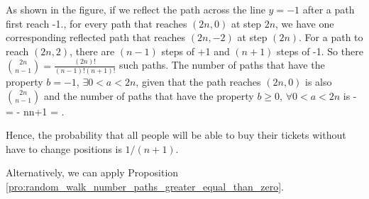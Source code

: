 \begin{solution}[\bf Solution.]
As shown in the figure, if we reflect the path across the line $y=-1$ after a path first reach -1., for every path that reaches $(2n,0)$ at step $2n$, we have one corresponding reflected path that
reaches $(2n,-2)$ at step $(2n)$. For a path to reach $(2n,2)$, there are $(n-1)$ steps of +1 and $(n+1)$ steps of -1. So there $\binom{2n}{n-1} = \frac{(2n)!}{(n-1)!(n+1)!}$ such paths. The number
of paths that have the property $b=-1$, $\exists 0<a<2n$, given that the path reaches $(2n,0)$ is also $\binom{2n}{n-1}$ and the number of paths that have the property $b\geq 0$, $\forall 0<a<2n$ is
\be
{} -  =  - \frac n{n+1} = .
\ee

Hence, the probability that all people will be able to buy their tickets without have to change positions is $1/(n+1)$.

Alternatively, we can apply Proposition \ref{pro:random_walk_number_paths_greater_equal_than_zero}.
\end{solution}
